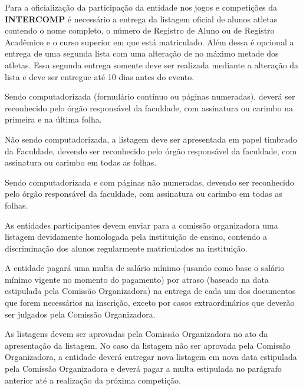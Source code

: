 \begin{article}
    \label{art:listagemoficial}
	Para a oficialização da participação da entidade nos jogos e competições da \textbf{INTERCOMP} é necessário a entrega da listagem oficial de alunos atletas contendo o nome completo, o número de Registro de Aluno ou de Registro Acadêmico e o curso superior em que está matriculado. Além dessa é opcional a entrega de uma segunda lista com uma alteração de no máximo metade dos atletas. Essa segunda entrega somente deve ser realizada mediante a alteração da lista e deve ser entregue até 10 dias antes do evento.

	\begin{xparagraph}
		Sendo computadorizada (formulário contínuo ou páginas numeradas), deverá ser reconhecido pelo órgão responsável da faculdade, com assinatura ou carimbo na primeira e na última folha.
	\end{xparagraph}

	\begin{xparagraph}
		Não sendo computadorizada, a listagem deve ser apresentada em papel timbrado da Faculdade, devendo ser reconhecido pelo órgão responsável da faculdade, com assinatura ou carimbo em todas as folhas.
	\end{xparagraph}

	\begin{xparagraph}
		Sendo computadorizada e com páginas não numeradas, devendo ser reconhecido pelo órgão responsável da faculdade, com assinatura ou carimbo em todas as folhas.
	\end{xparagraph}

	\begin{xparagraph}
    	As entidades participantes devem enviar para a comissão organizadora uma listagem devidamente homologada pela instituição de ensino, contendo a discriminação dos alunos regularmente matriculados na instituição.
	\end{xparagraph}

	\begin{xparagraph}
	    A entidade pagará uma multa de  salário mínimo (usando como base o salário mínimo vigente no momento do pagamento) por atraso (baseado na data estipulada pela Comissão Organizadora) na entrega de cada um dos documentos que forem necessários na inscrição, exceto por casos extraordinários que deverão ser julgados pela Comissão Organizadora.
	\end{xparagraph}

	\begin{xparagraph}
	    As listagens devem ser aprovadas pela Comissão Organizadora no ato da apresentação da listagem. No caso da listagem não ser aprovada pela Comissão Organizadora, a entidade deverá entregar nova listagem em nova data estipulada pela Comissão Organizadora e deverá pagar a multa estipulada no parágrafo anterior até a realização da próxima competição.
	\end{xparagraph}


\end{article}
